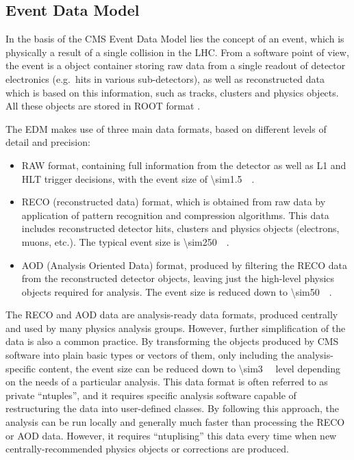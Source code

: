 \subsection{Event Data Model}
\label{ss:edm}
In the basis of the CMS Event Data Model lies the concept of an event, which is physically a result of a single
collision in the LHC. From a software point of view, the event is a \Cplusplus object container storing raw data from a
single readout of detector electronics (e.g.\ hits in various sub-detectors), as well as reconstructed data which is
based on this information, such as tracks, clusters and physics objects. All these \Cplusplus objects are stored in ROOT
format \autocite{ROOT}.

The EDM makes use of three main data formats, based on different levels of detail and precision:
\begin{itemize}
  \item RAW format, containing full information from the detector as well as L1 and HLT trigger decisions, with the
  event size of \SI{\sim1.5}{\mega\byte}.
  \item RECO (reconstructed data) format, which is obtained from raw data by application of pattern recognition and
  compression algorithms. This data includes reconstructed detector hits, clusters and physics objects (electrons,
  muons, etc.). The typical event size is \SI{\sim250}{\kilo\byte}.
  \item AOD (Analysis Oriented Data) format, produced by filtering the RECO data from the reconstructed detector
  objects, leaving just the high-level physics objects required for analysis. The event size is reduced down to
  \SI{\sim50}{\kilo\byte}.
\end{itemize}

The RECO and AOD data are analysis-ready data formats, produced centrally and used by many physics analysis groups.
However, further simplification of the data is also a common practice. By transforming the \Cplusplus objects produced
by CMS software into plain basic types or vectors of them, only including the analysis-specific content, the event size
can be reduced down to \SI{\sim3}{\kilo\byte} level depending on the needs of a particular analysis. This data format is
often referred to as private ``ntuples'', and it requires specific analysis software capable of restructuring the data
into user-defined classes. By following this approach, the analysis can be run locally and generally much faster than
processing the RECO or AOD data. However, it requires ``ntuplising'' this data every time when new centrally-recommended
physics objects or corrections are produced.

